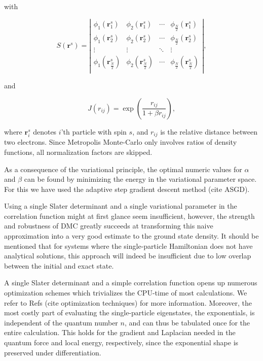 \documentclass[amsmath, amssymb, aps, floatfix, nofootinbib, preprintnumbers,showpacs, superscriptaddress, twocolumn]{revtex4-1}
\begin{document}
with

\begin{equation}
 S(\mathbf{r}^s) =  \left| \begin{array}{cccc}
\phi_1(\mathbf{r}^s_1) & \phi_2(\mathbf{r}^s_1)& \cdots & \phi_\frac{N}{2}(\mathbf{r}^s_1) \\
\phi_1(\mathbf{r}^s_2) & \phi_2(\mathbf{r}^s_2)& \cdots & \phi_\frac{N}{2}(\mathbf{r}^s_2) \\
\vdots & \vdots& \ddots & \vdots \\
\phi_1(\mathbf{r}^s_\frac{N}{2}) & \phi_2(\mathbf{r}^s_\frac{N}{2})& \cdots & \phi_\frac{N}{2}(\mathbf{r}^s_\frac{N}{2}) \\
 \end{array} \right|,
\end{equation}

and

\begin{equation}
 J(r_{ij}) = \exp\left(\frac{r_{ij}}{1 + \beta r_{ij}}\right),
\end{equation}

where $\mathbf{r}^s_i$ denotes $i$'th particle with spin $s$, and $r_{ij}$ is the relative distance between two electrons.
Since Metropolis Monte-Carlo only involves ratios of density functions, all normalization factors are skipped.

As a consequence of the variational principle, the optimal numeric values for $\alpha$ and $\beta$ can be found by minimizing the energy in the variational parameter space.
For this we have used the adaptive step gradient descent method (cite ASGD).

Using a single Slater determinant and a single variational parameter in the correlation function might at first glance seem insufficient,
however, the strength and robustness of DMC greatly succeeds at transforming this naive approximation into a very good estimate to the ground
state density. It should be mentioned that for systems where the single-particle Hamiltonian does not have analytical solutions, this approach
will indeed be insufficient due to low overlap between the initial and exact state.

A single Slater determinant and a simple correlation function opens up numerous optimization schemes which trivializes the CPU-time of most calculations.
We refer to Refs (cite optimization techniques) for more information.
Moreover, the most costly part of evaluating the single-particle eigenstates, the exponentials, is independent of the quantum number $n$, and can thus be tabulated once
for the entire calculation. This holds for the gradient and Laplacian needed in the quantum force and local energy, respectively, since the exponential shape is
preserved under differentiation.
\end{document}
